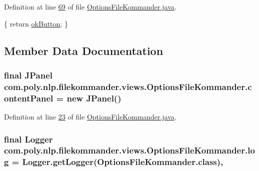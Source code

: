 Definition at line \hyperlink{L69}{69} of file \hyperlink{}{Options\-File\-Kommander.\-java}.


\begin{DoxyCode}
                                 \{
        \textcolor{keywordflow}{return} \hyperlink{classcom_1_1poly_1_1nlp_1_1filekommander_1_1views_1_1_options_file_kommander_a0f8aef931bc85b51505210be4fbc87e1}{okButton};
    \}
\end{DoxyCode}


\subsection{Member Data Documentation}
\hypertarget{classcom_1_1poly_1_1nlp_1_1filekommander_1_1views_1_1_options_file_kommander_a566cf729d42553b326dc4eaaf52cd9d8}{
\subsubsection[{content\-Panel}]{\setlength{\rightskip}{0pt plus 5cm}final J\-Panel com.\-poly.\-nlp.\-filekommander.\-views.\-Options\-File\-Kommander.\-content\-Panel = new J\-Panel()\hspace{0.3cm}{\ttfamily [private]}}}\label{classcom_1_1poly_1_1nlp_1_1filekommander_1_1views_1_1_options_file_kommander_a566cf729d42553b326dc4eaaf52cd9d8}


Definition at line \hyperlink{L23}{23} of file \hyperlink{}{Options\-File\-Kommander.\-java}.

\hypertarget{classcom_1_1poly_1_1nlp_1_1filekommander_1_1views_1_1_options_file_kommander_aaf488bac9983e9c54d0470f623d038a9}{
\subsubsection[{log}]{\setlength{\rightskip}{0pt plus 5cm}final Logger com.\-poly.\-nlp.\-filekommander.\-views.\-Options\-File\-Kommander.\-log = Logger.\-get\-Logger(Options\-File\-Kommander.\-class)\hspace{0.3cm}{\ttfamily [static]}, {\ttfamily [private]}}}\label{classcom_1_1poly_1_1nlp_1_1filekommander_1_1views_1_1_options_file_kommander_aaf488bac9983e9c54d0470f623d038a9}


